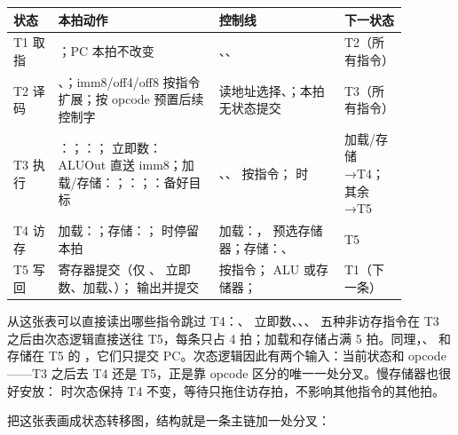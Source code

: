\begin{longtable}{L{0.1\linewidth}L{0.36\linewidth}L{0.28\linewidth}L{0.14\linewidth}}
\toprule
状态 & 本拍动作 & 控制线 & 下一状态 \\
\midrule
T1 取指 & ；PC 本拍不改变 & 、、 & T2（所有指令） \\
T2 译码 & 、；imm8/off4/off8 按指令扩展；按 opcode 预置后续控制字 & 读地址选择、；本拍无状态提交 & T3（所有指令） \\
T3 执行 & ：；：； 立即数：ALUOut 直送 imm8；加载/存储：；：；：备好目标 & 、、 按指令； 时  & 加载/存储→T4；其余→T5 \\
T4 访存 & 加载：；存储：； 时停留本拍 & 加载：， 预选存储器；存储：、 & T5 \\
T5 写回 & 寄存器提交（仅 、 立即数、加载、）； 输出并提交 &  按指令； ALU 或存储器； & T1（下一条） \\
\bottomrule
\end{longtable}

从这张表可以直接读出哪些指令跳过 T4：、 立即数、、、 五种非访存指令在 T3 之后由次态逻辑直接送往 T5，每条只占 4 拍；加载和存储占满 5 拍。同理，、 和存储在 T5 的 ，它们只提交 PC。次态逻辑因此有两个输入：当前状态和 opcode——T3 之后去 T4 还是 T5，正是靠 opcode 区分的唯一一处分叉。慢存储器也很好安放： 时次态保持 T4 不变，等待只拖住访存拍，不影响其他指令的其他拍。

把这张表画成状态转移图，结构就是一条主链加一处分叉：

